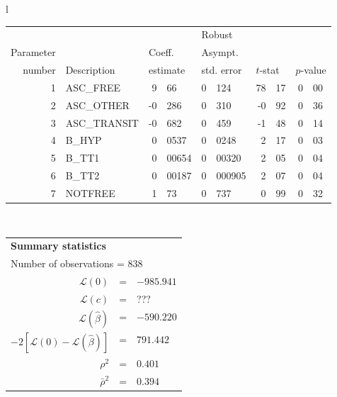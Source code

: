   \begin{tabular}{l}
\begin{tabular}{rlr@{.}lr@{.}lr@{.}lr@{.}l}
         &                       &   \multicolumn{2}{l}{}    & \multicolumn{2}{l}{Robust}  &     \multicolumn{4}{l}{}   \\
Parameter &                       &   \multicolumn{2}{l}{Coeff.}      & \multicolumn{2}{l}{Asympt.}  &     \multicolumn{4}{l}{}   \\
number &  Description                     &   \multicolumn{2}{l}{estimate}      & \multicolumn{2}{l}{std. error}  &   \multicolumn{2}{l}{$t$-stat}  &   \multicolumn{2}{l}{$p$-value}   \\

\hline

1 & ASC\_FREE & 9&66 & 0&124 & 78&17 & 0&00 \\
2 & ASC\_OTHER & -0&286 & 0&310 & -0&92 & 0&36 \\
3 & ASC\_TRANSIT & -0&682 & 0&459 & -1&48 & 0&14 \\
4 & B\_HYP & 0&0537 & 0&0248 & 2&17 & 0&03 \\
5 & B\_TT1 & 0&00654 & 0&00320 & 2&05 & 0&04 \\
6 & B\_TT2 & 0&00187 & 0&000905 & 2&07 & 0&04 \\
\hline
7 & NOTFREE & 1&73 & 0&737 & 0&99\footnotemark[1] & 0&32 \\
\hline

\end{tabular}
\\
\begin{tabular}{rcl}
\multicolumn{3}{l}{\bf Summary statistics}\\
\multicolumn{3}{l}{ Number of observations = $838$} \\
 $\mathcal{L}(0)$ &=&  $-985.941$ \\
 $\mathcal{L}(c)$ &=& ???\\
 $\mathcal{L}(\hat{\beta})$ &=& $-590.220 $  \\
 $-2[\mathcal{L}(0) -\mathcal{L}(\hat{\beta})]$ &=& $791.442$ \\
    $\rho^2$ &=&   $0.401$ \\
    $\bar{\rho}^2$ &=&    $0.394$ \\
\end{tabular}
\end{tabular}


